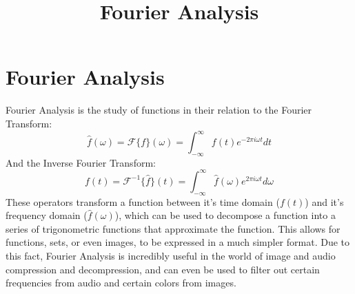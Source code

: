 \documentclass[12pt]{article}
\title{Fourier Analysis}
\newcommand{\f}[2]{\mathcal{F}\{#1\}(\omega) = \int_{-\infty}^{\infty}#2e^{-2\pi i\omega t}dt}
\newcommand{\finverse}[2]{\mathcal{F}^{-1}\{#1\}(t) = \int_{-\infty}^{\infty}#2e^{2\pi i\omega t}d\omega}
\begin{document}
    \maketitle
    \tableofcontents

    \section{Fourier Analysis}
    Fourier Analysis is the study of functions in their relation to the Fourier Transform: \[\hat{f}(\omega) = \f{f}{f(t)}\] And the Inverse Fourier Transform: \[f(t) = \finverse{\hat{f}}{\hat{f}(\omega)}\]
    These operators transform a function between it's time domain ($f(t)$) and it's frequency domain ($\hat{f}(\omega)$), which can be used to decompose a function into a series of trigonometric functions that approximate the function. This allows for functions, sets, or even images, to be expressed in a much simpler format. Due to this fact, Fourier Analysis is incredibly useful in the world of image and audio compression and decompression, and can even be used to filter out certain frequencies from audio and certain colors from images.
\end{document}
